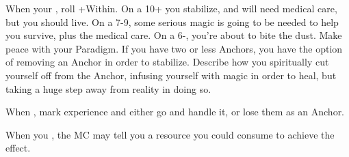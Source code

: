\begin{multicols}{3}
\begin{move}
  \end{move}

  \vspace{-2em}
  
  \SEPARATOR
  
  \begin{move}
    When your , roll +Within. On a 10+ you stabilize, and will need medical care, but you should live. On a 7-9, some serious magic is going to be needed to help you survive, plus the medical care. On a 6-, you’re about to bite the dust. Make peace with your Paradigm. If you have two or less Anchors, you have the option of removing an Anchor in order to stabilize. Describe how you spiritually cut yourself off from the Anchor, infusing yourself with magic in order to heal, but taking a huge step away from reality in doing so.

  \end{move}

  \SEPARATOR

  \begin{move}
    When , mark experience and either go and handle it, or lose them as an Anchor.

  \end{move}

  \SEPARATOR

  \begin{move}
    When you , the MC may tell you a resource you could consume to achieve the effect.

  \end{move}

\end{multicols}
